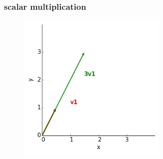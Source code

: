 \documentclass{beamer}
\begin{document}
\begin{frame}
\frametitle{scalar multiplication}

\begin{figure}[htbp]
\begin{center}
\includegraphics[width=0.65\textwidth]{figure3b.png}
\caption{}
\end{center}
\end{figure}

\end{frame}
\end{document}
